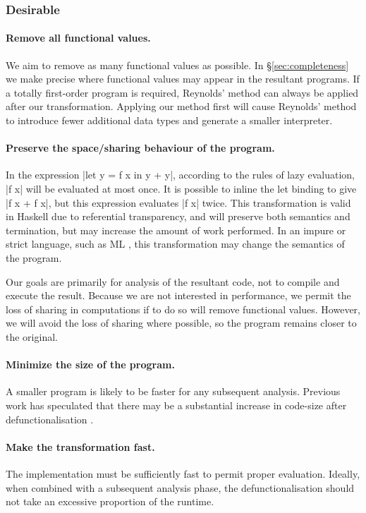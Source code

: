\documentclass[preprint]{sigplanconf}
\begin{document}
\subsubsection*{Desirable}

\paragraph{Remove all functional values.} We aim to remove as many functional values as possible. In \S\ref{sec:completeness} we make precise where functional values may appear in the resultant programs. If a totally first-order program is required, Reynolds' method can always be applied after our transformation. Applying our method first will cause Reynolds' method to introduce fewer additional data types and generate a smaller interpreter.

\paragraph{Preserve the space/sharing behaviour of the program.} In the expression |let y = f x in y + y|, according to the rules of lazy evaluation, |f x| will be evaluated at most once. It is possible to inline the let binding to give |f x + f x|, but this expression evaluates |f x| twice. This transformation is valid in Haskell due to referential transparency, and will preserve both semantics and termination, but may increase the amount of work performed. In an impure or strict language, such as ML \cite{ml}, this transformation may change the semantics of the program.

Our goals are primarily for analysis of the resultant code, not to compile and execute the result. Because we are not interested in performance, we permit the loss of sharing in computations if to do so will remove functional values. However, we will avoid the loss of sharing where possible, so the program remains closer to the original.

\paragraph{Minimize the size of the program.} A smaller program is likely to be faster for any subsequent analysis. Previous work has speculated that there may be a substantial increase in code-size after defunctionalisation \cite{chin:higher_order_removal}.

\paragraph{Make the transformation fast.} The implementation must be sufficiently fast to permit proper evaluation. Ideally, when combined with a subsequent analysis phase, the defunctionalisation should not take an excessive proportion of the runtime.
\end{document}
